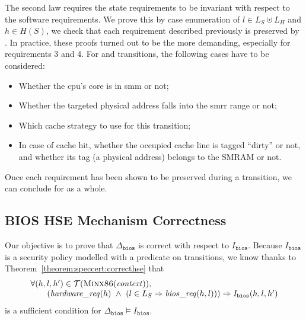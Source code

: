 The second law requires the state requirements to be invariant with respect to the
software requirements.
%
We prove this by case enumeration of \( l \in L_S \uplus L_H \) and
\( h \in H(S) \), we check that each requirement described previously is
preserved by .
%
In practice, these proofs turned out to be the more demanding, especially for
requirements 3 and 4.
%
For  and  transitions, the following cases have to be
considered:
%
\begin{itemize}
\item Whether the \ac{cpu}'s core is in \ac{smm} or not;
\item Whether the targeted physical address falls into the \ac{smrr} range or
  not;
\item Which cache strategy to use for this transition;
\item In case of cache hit, whether the occupied cache line is tagged ``dirty''
  or not, and whether its tag (a physical address) belongs to the SMRAM or not.
\end{itemize}
%
Once each requirement has been shown to be preserved during a transition, we can
conclude for  as a whole.


\subsection{BIOS HSE Mechanism Correctness}

Our objective is to prove that \( \Delta_{\mathtt{bios}} \) is correct with
respect to \( I_{\mathtt{bios}} \).
%
Because \( I_{\mathtt{bios}} \) is a security policy modelled with a predicate
on transitions, we know thanks to Theorem~\ref{theorem:speccert:correcthse} that
%
\[
  \begin{array}{l}
    \forall (h, l, h') \in \mathcal{T}(\textsc{Minx86}(\mathit{context})), \\
    \qquad (\mathit{hardware\_req}(h)\ \wedge\ (l \in L_S \Rightarrow
    \mathit{bios\_req}(h, l))) \Rightarrow I_{\mathtt{bios}}(h, l, h')
  \end{array}
\]
%
is a sufficient condition for
\( \Delta_{\mathtt{bios}} \models I_{\mathtt{bios}} \).

